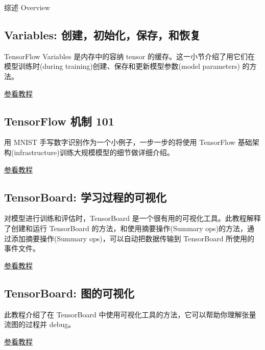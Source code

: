 


综述 Overview

\subsection{Variables:
创建，初始化，保存，和恢复}\label{variables-ux521bux5efaux521dux59cbux5316ux4fddux5b58ux548cux6062ux590d}

TensorFlow Variables 是内存中的容纳 tensor
的缓存。这一小节介绍了用它们在模型训练时(during
training)创建、保存和更新模型参数(model parameters) 的方法。

\href{../how_tos/variables.md}{参看教程}

\subsection{TensorFlow 机制 101}\label{tensorflow-ux673aux5236-101}

用 MNIST 手写数字识别作为一个小例子，一步一步的将使用 TensorFlow
基础架构(infrastructure)训练大规模模型的细节做详细介绍。

\href{../tutorials/mnist_tf.md}{参看教程}

\subsection{TensorBoard:
学习过程的可视化}\label{tensorboard-ux5b66ux4e60ux8fc7ux7a0bux7684ux53efux89c6ux5316}

对模型进行训练和评估时，TensorBoard
是一个很有用的可视化工具。此教程解释了创建和运行 TensorBoard
的方法，和使用摘要操作(Summary ops)的方法，通过添加摘要操作(Summary
ops)，可以自动把数据传输到 TensorBoard 所使用的事件文件。

\href{../how_tos/summaries_and_tensorboard.md}{参看教程}

\subsection{TensorBoard:
图的可视化}\label{tensorboard-ux56feux7684ux53efux89c6ux5316}

此教程介绍了在 TensorBoard
中使用可视化工具的方法，它可以帮助你理解张量流图的过程并 debug。

\href{../how_tos/graph_viz.md}{参看教程}

